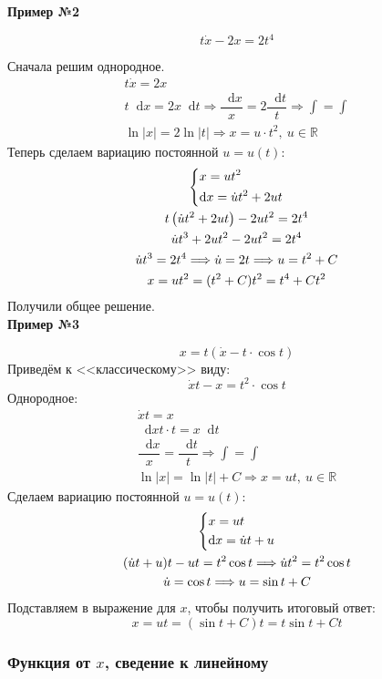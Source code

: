 \documentclass[a4paper,12pt]{article}
\newcommand{\R}{\mathbb{R}}
\renewcommand*\d{\mathop{}\!\mathrm{d}}
\newcommand{\du}{\dot{u}}
\newcommand{\dx}{\dot{x}}
\newcommand{\ds}{\displaystyle}
\begin{document}
\textbf{Пример №2}

\[t\dx - 2x = 2t^4\]

Сначала решим однородное.
\begin{gather*}
	t\dx = 2x\\
	t\d x = 2x \d t \Longrightarrow \dfrac{\d x}{x} = 2\dfrac{\d t}{t} \Longrightarrow \ds\int=\int\\
	\ln|x| = 2\ln|t| \Longrightarrow x = u\cdot t^2,\ u \in \R
\end{gather*}
Теперь сделаем вариацию постоянной $u = u(t)$:
\begin{gather*}
	\left\{\begin{gathered}
	x = ut^2\hfill\\
	\d x = \du t^2 + 2ut\hfill
	\end{gathered}\right.\\
	t\left(\du t^2 + 2ut\right) - 2ut^2 = 2t^4\\
	\du t^3 +2ut^2 - 2ut^2 = 2t^4\\
	\du t^3 = 2t^4 \Longrightarrow \du = 2t \Longrightarrow u = t^2 + C\\
	x = ut^2 = (t^2 + C)t^2 = t^4 + Ct^2
\end{gather*}
Получили общее решение.
\ \\

\textbf{Пример №3}

\[x = t(\dx - t\cdot\cos t)\]
Приведём к <<классическому>> виду:
\[\dx t - x = t^2\cdot \cos t\]
Однородное:
\begin{gather*}
\dx t = x\\
\d x t \cdot t = x\d t\\
\dfrac{\d x}{x} = \dfrac{\d t}{t} \Longrightarrow \ds\int = \int\\
\ln|x| = \ln|t| + C \Longrightarrow x = ut,\ u \in \R
\end{gather*}
Сделаем вариацию постоянной $u = u(t)$:\
\begin{gather*}
\left\{\begin{gathered}
x = ut\hfill\\
\d x = \du t + u\hfill
\end{gathered}\right.\\
(\du t + u)t - ut = t^2\cos t \Longrightarrow \du t^2 = t^2\cos t\\
\du = \cos t \Longrightarrow u = \sin t + C
\end{gather*}
Подставляем в выражение для $x$, чтобы получить итоговый ответ:
\[x = ut = (\sin t + C)t = t\sin t + Ct\]

\subsubsection{Функция от $x$, сведение к линейному}
\end{document}
